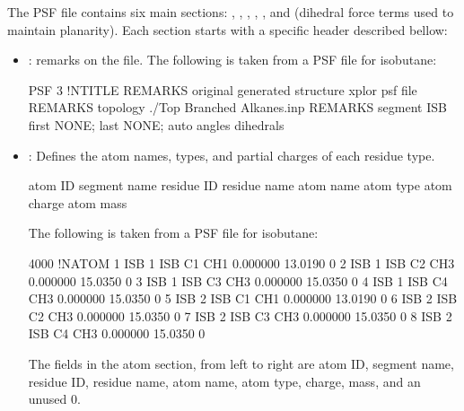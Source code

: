 \documentclass[letterpaper,10pt,english]{sphinxmanual}
\begin{document}
The PSF file contains six main sections: , , , , , and  (dihedral force terms used to maintain planarity). Each section starts with a specific header described bellow:
\begin{itemize}
\item {} 
: remarks on the file.
The following is taken from a PSF file for isobutane:

%
\begin{sphinxVerbatim}[commandchars=\\\{\}]
PSF
      3  !NTITLE
REMARKS  original generated structure x\PYGZhy{}plor psf file
REMARKS  topology ./Top Branched Alkanes.inp
REMARKS  segment ISB \PYGZob{} first NONE; last NONE; auto angles dihedrals \PYGZcb{}
\end{sphinxVerbatim}

\item {} 
: Defines the atom names, types, and partial charges of each residue type.

%
\begin{sphinxVerbatim}[commandchars=\\\{\}]
atom ID
segment name
residue ID
residue name
atom name
atom type
atom charge
atom mass
\end{sphinxVerbatim}

The following is taken from a PSF file for isobutane:

%
\begin{sphinxVerbatim}[commandchars=\\\{\}]
4000 !NATOM
1    ISB  1  ISB    C1    CH1    0.000000   13.0190  0
2    ISB  1  ISB    C2    CH3    0.000000   15.0350  0
3    ISB  1  ISB    C3    CH3    0.000000   15.0350  0
4    ISB  1  ISB    C4    CH3    0.000000   15.0350  0
5    ISB  2  ISB    C1    CH1    0.000000   13.0190  0
6    ISB  2  ISB    C2    CH3    0.000000   15.0350  0
7    ISB  2  ISB    C3    CH3    0.000000   15.0350  0
8    ISB  2  ISB    C4    CH3    0.000000   15.0350  0
\end{sphinxVerbatim}

The fields in the atom section, from left to right are atom ID, segment name, residue ID, residue name, atom name, atom type, charge, mass, and an unused 0.


\end{itemize}
\end{document}
